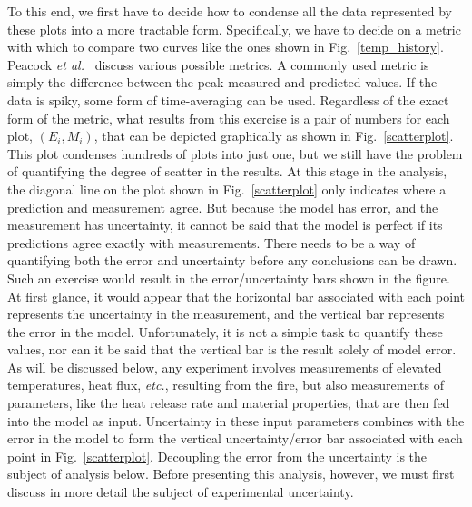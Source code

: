 To this end, we first have to decide how to condense all the data represented by these plots into a more tractable form. Specifically, we
have to decide on a metric with which to compare two curves like the ones shown in Fig.~\ref{temp_history}. Peacock {\em et al.}~\cite{Peacock:FSJ1999}
discuss various possible metrics. A commonly used metric is simply the difference between the peak measured and predicted values.
If the data is spiky, some form of time-averaging can be used. Regardless of the exact form of the metric, what results from
this exercise is a pair of numbers for each plot, $(E_i,M_i)$, that can be depicted graphically as shown in Fig.~\ref{scatterplot}. This plot
condenses hundreds of plots into just one, but we still have the problem of quantifying the degree of scatter in the results. At this stage in the analysis, the
diagonal line on the plot shown in Fig.~\ref{scatterplot} only indicates where a prediction and measurement agree. But because the model has error, and
the measurement has uncertainty, it cannot be said that the model is perfect if its predictions agree exactly with measurements. There needs to be a way of quantifying
both the error and uncertainty before any conclusions can be drawn.
Such an exercise would result in the error/uncertainty bars shown in the figure. At first glance, it would appear that the
horizontal bar associated with each point represents the uncertainty in the measurement, and the vertical bar represents the error in the model. Unfortunately, it
is not a simple task to quantify these values, nor can it be said that the vertical bar is the result solely of model error. As will be discussed below, any
experiment involves measurements of elevated temperatures, heat flux, {\em etc.}, resulting from the fire, but also measurements of parameters, like the
heat release rate and material properties, that are then fed into the model as input. Uncertainty in these input parameters combines with the error in the model
to form the vertical uncertainty/error bar associated with each point in Fig.~\ref{scatterplot}. Decoupling the error from the uncertainty
is the subject of analysis below. Before presenting this
analysis, however, we must first discuss in more detail the subject of experimental uncertainty.


